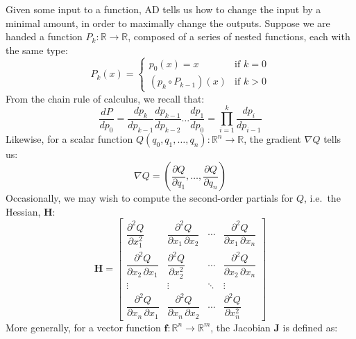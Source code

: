 \documentclass[12pt,initial,twoside,maitrise]{dms}
\numberwithin{equation}{section}
\numberwithin{table}{chapter}
\numberwithin{figure}{chapter}
\begin{document}
Given some input to a function, AD tells us how to change the input by a minimal amount, in order to maximally change the outputs. Suppose we are handed a function $P_k: \mathbb{R}\rightarrow\mathbb{R}$, composed of a series of nested functions, each with the same type:
%
\begin{equation}
    P_k(x) = \begin{cases} p_0(x) = x &\text{if } k=0\\ (p_k\circ P_{k-1})(x)&\text{if } k > 0 \end{cases}
\end{equation}
%
From the chain rule of calculus, we recall that:
%
\begin{equation}
    \frac{dP}{dp_0} = \frac{dp_k}{dp_{k-1}}\frac{dp_{k-1}}{dp_{k-2}}\dots\frac{dp_1}{dp_0}= {\displaystyle \prod_{i=1}^{k} \frac{dp_{i}}{dp_{i-1}}}
\end{equation}
%
Likewise, for a scalar function $Q(q_0, q_1, \dots, q_n):  \mathbb{R}^n\rightarrow\mathbb{R}$, the gradient $\nabla Q$ tells us:
%
\begin{equation}
    \nabla Q = \left( \frac{\partial Q}{\partial q_1}, \dots, \frac{\partial Q}{\partial q_n}\right)
\end{equation}
%
Occasionally, we may wish to compute the second-order partials for $Q$, i.e.\ the Hessian, $\mathbf{H}$:
%
\begin{equation}
\mathbf{H} = \begin{bmatrix}{\dfrac {\partial ^{2}Q}{\partial x_{1}^{2}}}&{\dfrac {\partial ^{2}Q}{\partial x_{1}\,\partial x_{2}}}&\cdots &{\dfrac {\partial ^{2}Q}{\partial x_{1}\,\partial x_{n}}}\\[2.2ex]{\dfrac {\partial ^{2}Q}{\partial x_{2}\,\partial x_{1}}}&{\dfrac {\partial ^{2}Q}{\partial x_{2}^{2}}}&\cdots &{\dfrac {\partial ^{2}Q}{\partial x_{2}\,\partial x_{n}}}\\[2.2ex]\vdots &\vdots &\ddots &\vdots \\[2.2ex]{\dfrac {\partial ^{2}Q}{\partial x_{n}\,\partial x_{1}}}&{\dfrac {\partial ^{2}Q}{\partial x_{n}\,\partial x_{2}}}&\cdots &{\dfrac {\partial ^{2}Q}{\partial x_{n}^{2}}}\end{bmatrix}
\end{equation}
%
More generally, for a vector function $\mathbf{f}:  \mathbb{R}^n\rightarrow\mathbb{R}^m$, the Jacobian $\mathbf J$ is defined as:
%
\end{document}
